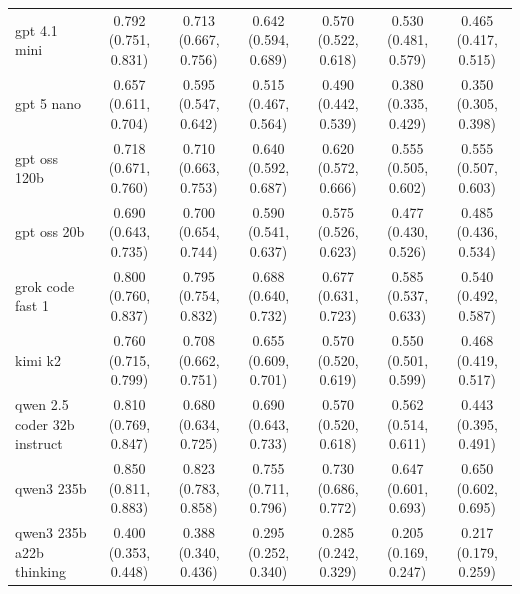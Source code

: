 \begin{table}[h!]
{\begin{tabular}{lcccccc}
gpt 4.1 mini & \cellcolor{green!55}0.792 (0.751, 0.831) & \cellcolor{green!60}0.713 (0.667, 0.756) & \cellcolor{green!50}0.642 (0.594, 0.689) & \cellcolor{green!40}0.570 (0.522, 0.618) & \cellcolor{green!45}0.530 (0.481, 0.579) & \cellcolor{green!40}0.465 (0.417, 0.515) \\
gpt 5 nano & \cellcolor{green!20}0.657 (0.611, 0.704) & \cellcolor{green!20}0.595 (0.547, 0.642) & \cellcolor{green!20}0.515 (0.467, 0.564) & \cellcolor{green!20}0.490 (0.442, 0.539) & \cellcolor{green!14}0.380 (0.335, 0.429) & \cellcolor{green!20}0.350 (0.305, 0.398) \\
gpt oss 120b & \cellcolor{green!40}0.718 (0.671, 0.760) & \cellcolor{green!50}0.710 (0.663, 0.753) & \cellcolor{green!45}0.640 (0.592, 0.687) & \cellcolor{green!60}0.620 (0.572, 0.666) & \cellcolor{green!55}0.555 (0.505, 0.602) & \cellcolor{green!65}0.555 (0.507, 0.603) \\
gpt oss 20b & \cellcolor{green!25}0.690 (0.643, 0.735) & \cellcolor{green!40}0.700 (0.654, 0.744) & \cellcolor{green!40}0.590 (0.541, 0.637) & \cellcolor{green!55}0.575 (0.526, 0.623) & \cellcolor{green!30}0.477 (0.430, 0.526) & \cellcolor{green!55}0.485 (0.436, 0.534) \\
grok code fast 1 & \cellcolor{green!60}0.800 (0.760, 0.837) & \cellcolor{green!75}0.795 (0.754, 0.832) & \cellcolor{green!60}0.688 (0.640, 0.732) & \cellcolor{green!65}0.677 (0.631, 0.723) & \cellcolor{green!65}0.585 (0.537, 0.633) & \cellcolor{green!60}0.540 (0.492, 0.587) \\
kimi k2 & \cellcolor{green!45}0.760 (0.715, 0.799) & \cellcolor{green!45}0.708 (0.662, 0.751) & \cellcolor{green!55}0.655 (0.609, 0.701) & \cellcolor{green!45}0.570 (0.520, 0.619) & \cellcolor{green!50}0.550 (0.501, 0.599) & \cellcolor{green!45}0.468 (0.419, 0.517) \\
qwen 2.5 coder 32b instruct & \cellcolor{green!65}0.810 (0.769, 0.847) & \cellcolor{green!35}0.680 (0.634, 0.725) & \cellcolor{green!65}0.690 (0.643, 0.733) & \cellcolor{green!50}0.570 (0.520, 0.618) & \cellcolor{green!60}0.562 (0.514, 0.611) & \cellcolor{green!35}0.443 (0.395, 0.491) \\
qwen3 235b & \cellcolor{green!70}0.850 (0.811, 0.883) & \cellcolor{green!80}0.823 (0.783, 0.858) & \cellcolor{green!70}0.755 (0.711, 0.796) & \cellcolor{green!80}0.730 (0.686, 0.772) & \cellcolor{green!70}0.647 (0.601, 0.693) & \cellcolor{green!70}0.650 (0.602, 0.695) \\
qwen3 235b a22b thinking & \cellcolor{green!5}0.400 (0.353, 0.448) & \cellcolor{green!5}0.388 (0.340, 0.436) & \cellcolor{green!5}0.295 (0.252, 0.340) & \cellcolor{green!5}0.285 (0.242, 0.329) & \cellcolor{green!5}0.205 (0.169, 0.247) & \cellcolor{green!5}0.217 (0.179, 0.259) \\

\end{tabular}}
\end{table}
